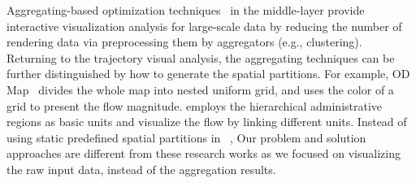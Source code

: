 Aggregating-based optimization techniques~\cite{zeng2013visualizing,von2015mobilitygraphs} in the middle-layer provide interactive visualization analysis for large-scale data by 
reducing the number of rendering data via preprocessing them by aggregators (e.g., clustering).
Returning to the trajectory visual analysis, the aggregating techniques can be further distinguished by how to generate the spatial partitions.
For example, OD Map~\cite{wood2010visualisation} divides the whole map into nested uniform grid, and uses the color of a grid to present the flow magnitude.
\cite{guo2009flow} employs the hierarchical administrative regions as basic units and visualize the flow by linking different units.
Instead of using static predefined spatial partitions in ~\cite{wood2010visualisation,guo2009flow},
Our problem and solution approaches are different from these research works as we focused on visualizing the raw input data, instead of the aggregation results.


